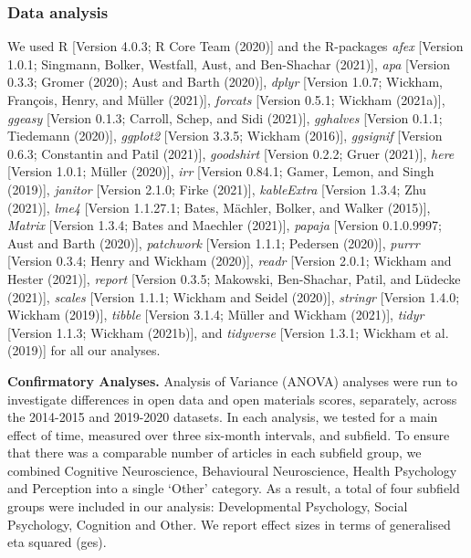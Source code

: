\documentclass[
  english,
  man,floatsintext]{apa6}
\begin{document}
\hypertarget{data-analysis}{%
\subsubsection{Data analysis}\label{data-analysis}}

We used R {[}Version 4.0.3; R Core Team (2020){]} and the R-packages \emph{afex} {[}Version 1.0.1; Singmann, Bolker, Westfall, Aust, and Ben-Shachar (2021){]}, \emph{apa} {[}Version 0.3.3; Gromer (2020); Aust and Barth (2020){]}, \emph{dplyr} {[}Version 1.0.7; Wickham, François, Henry, and Müller (2021){]}, \emph{forcats} {[}Version 0.5.1; Wickham (2021a){]}, \emph{ggeasy} {[}Version 0.1.3; Carroll, Schep, and Sidi (2021){]}, \emph{gghalves} {[}Version 0.1.1; Tiedemann (2020){]}, \emph{ggplot2} {[}Version 3.3.5; Wickham (2016){]}, \emph{ggsignif} {[}Version 0.6.3; Constantin and Patil (2021){]}, \emph{goodshirt} {[}Version 0.2.2; Gruer (2021){]}, \emph{here} {[}Version 1.0.1; Müller (2020){]}, \emph{irr} {[}Version 0.84.1; Gamer, Lemon, and Singh (2019){]}, \emph{janitor} {[}Version 2.1.0; Firke (2021){]}, \emph{kableExtra} {[}Version 1.3.4; Zhu (2021){]}, \emph{lme4} {[}Version 1.1.27.1; Bates, Mächler, Bolker, and Walker (2015){]}, \emph{Matrix} {[}Version 1.3.4; Bates and Maechler (2021){]}, \emph{papaja} {[}Version 0.1.0.9997; Aust and Barth (2020){]}, \emph{patchwork} {[}Version 1.1.1; Pedersen (2020){]}, \emph{purrr} {[}Version 0.3.4; Henry and Wickham (2020){]}, \emph{readr} {[}Version 2.0.1; Wickham and Hester (2021){]}, \emph{report} {[}Version 0.3.5; Makowski, Ben-Shachar, Patil, and Lüdecke (2021){]}, \emph{scales} {[}Version 1.1.1; Wickham and Seidel (2020){]}, \emph{stringr} {[}Version 1.4.0; Wickham (2019){]}, \emph{tibble} {[}Version 3.1.4; Müller and Wickham (2021){]}, \emph{tidyr} {[}Version 1.1.3; Wickham (2021b){]}, and \emph{tidyverse} {[}Version 1.3.1; Wickham et al. (2019){]} for all our analyses.

\textbf{Confirmatory Analyses.} Analysis of Variance (ANOVA) analyses were run to investigate differences in open data and open materials scores, separately, across the 2014-2015 and 2019-2020 datasets. In each analysis, we tested for a main effect of time, measured over three six-month intervals, and subfield. To ensure that there was a comparable number of articles in each subfield group, we combined Cognitive Neuroscience, Behavioural Neuroscience, Health Psychology and Perception into a single `Other' category. As a result, a total of four subfield groups were included in our analysis: Developmental Psychology, Social Psychology, Cognition and Other. We report effect sizes in terms of generalised eta squared (ges).
\end{document}
